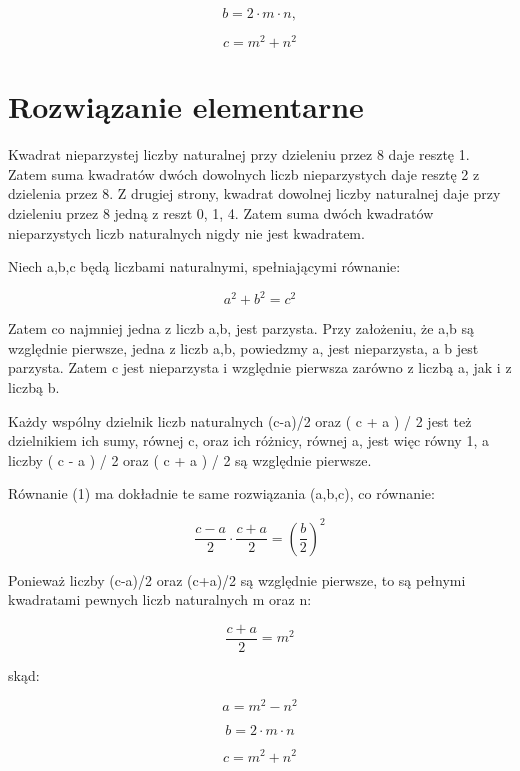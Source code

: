 \documentclass{article}
\begin{document}
\begin{equation*}
	b=2\cdot m\cdot n,
\end{equation*}

\begin{displaymath}
	c=m^{2}+n^{2}
\end{displaymath}

\section*{Rozwiązanie elementarne}
Kwadrat nieparzystej liczby naturalnej przy dzieleniu przez 8 daje resztę 1. Zatem suma kwadratów dwóch dowolnych liczb nieparzystych daje resztę 2 z dzielenia przez 8. Z drugiej strony, kwadrat dowolnej liczby naturalnej daje przy dzieleniu przez 8 jedną z reszt 0, 1, 4. Zatem suma dwóch kwadratów nieparzystych liczb naturalnych nigdy nie jest kwadratem.

Niech a,b,c będą liczbami naturalnymi, spełniającymi równanie:

\[a^{2}+b^{2}=c^{2}\]

Zatem co najmniej jedna z liczb a,b, jest parzysta. Przy założeniu, że a,b są względnie pierwsze, jedna z liczb a,b, powiedzmy a, jest nieparzysta, a b jest parzysta. Zatem c jest nieparzysta i względnie pierwsza zarówno z liczbą a, jak i z liczbą b.

Każdy wspólny dzielnik liczb naturalnych (c-a)/2 oraz ( c + a ) / 2 jest też dzielnikiem ich sumy, równej c, oraz ich różnicy, równej a, jest więc równy 1, a liczby ( c - a ) / 2 oraz ( c + a ) / 2 są względnie pierwsze. 



Równanie (1) ma dokładnie te same rozwiązania (a,b,c), co równanie:

$$ {\frac {c-a}{2}}\cdot {\frac {c+a}{2}}=\left({\frac {b}{2}}\right)^{2} $$

Ponieważ liczby (c-a)/2 oraz (c+a)/2 są względnie pierwsze, to są pełnymi kwadratami pewnych liczb naturalnych m oraz n:

\begin{equation}
	{\frac {c+a}{2}}=m^{2}
\end{equation}

skąd:

$$ a=m^{2}-n^{2} $$

$$ b=2\cdot m\cdot n $$

$$ c=m^{2}+n^{2} $$
\end{document}
